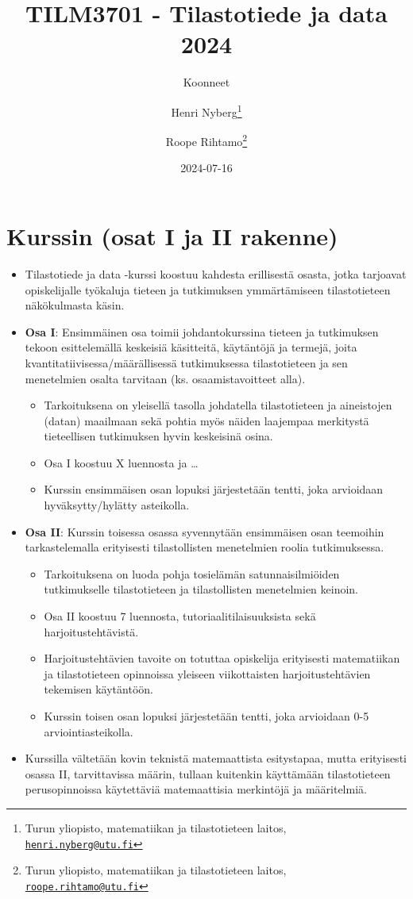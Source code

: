 \documentclass[
]{book}
\title{TILM3701 - Tilastotiede ja data 2024}
\author{Koonneet \and Henri Nyberg\footnote{Turun yliopisto, matematiikan ja tilastotieteen laitos, \href{mailto:henri.nyberg@utu.fi}{\nolinkurl{henri.nyberg@utu.fi}}} \and Roope Rihtamo\footnote{Turun yliopisto, matematiikan ja tilastotieteen laitos, \href{mailto:roope.rihtamo@utu.fi}{\nolinkurl{roope.rihtamo@utu.fi}}}}
\date{2024-07-16}
\providecommand{\tightlist}{%
  \setlength{\itemsep}{0pt}\setlength{\parskip}{0pt}}
\begin{document}
\maketitle

{
\hypersetup{linkcolor=}
\setcounter{tocdepth}{1}
\tableofcontents
}
\hypertarget{kurssin-osat-i-ja-ii-rakenne}{%
\chapter*{Kurssin (osat I ja II rakenne)}\label{kurssin-osat-i-ja-ii-rakenne}}

\begin{itemize}
\tightlist
\item
  Tilastotiede ja data -kurssi koostuu kahdesta erillisestä osasta, jotka tarjoavat opiskelijalle työkaluja tieteen ja tutkimuksen ymmärtämiseen tilastotieteen näkökulmasta käsin.
\item
  \textbf{Osa I}: Ensimmäinen osa toimii johdantokurssina tieteen ja tutkimuksen tekoon esittelemällä keskeisiä käsitteitä, käytäntöjä ja termejä, joita kvantitatiivisessa/määrällisessä tutkimuksessa tilastotieteen ja sen menetelmien osalta tarvitaan (ks. osaamistavoitteet alla).

  \begin{itemize}
  \tightlist
  \item
    Tarkoituksena on yleisellä tasolla johdatella tilastotieteen ja aineistojen (datan) maailmaan sekä pohtia myös näiden laajempaa merkitystä tieteellisen tutkimuksen hyvin keskeisinä osina.
  \item
    Osa I koostuu X luennosta ja \ldots{}
  \item
    Kurssin ensimmäisen osan lopuksi järjestetään tentti, joka arvioidaan hyväksytty/hylätty asteikolla.
  \end{itemize}
\item
  \textbf{Osa II}: Kurssin toisessa osassa syvennytään ensimmäisen osan teemoihin tarkastelemalla erityisesti tilastollisten menetelmien roolia tutkimuksessa.

  \begin{itemize}
  \tightlist
  \item
    Tarkoituksena on luoda pohja tosielämän satunnaisilmiöiden tutkimukselle tilastotieteen ja tilastollisten menetelmien keinoin.
  \item
    Osa II koostuu 7 luennosta, tutoriaalitilaisuuksista sekä harjoitustehtävistä.
  \item
    Harjoitustehtävien tavoite on totuttaa opiskelija erityisesti matematiikan ja tilastotieteen opinnoissa yleiseen viikottaisten harjoitustehtävien tekemisen käytäntöön.
  \item
    Kurssin toisen osan lopuksi järjestetään tentti, joka arvioidaan 0-5 arviointiasteikolla.
  \end{itemize}
\item
  Kurssilla vältetään kovin teknistä matemaattista esitystapaa, mutta erityisesti osassa II, tarvittavissa määrin, tullaan kuitenkin käyttämään tilastotieteen perusopinnoissa käytettäviä matemaattisia merkintöjä ja määritelmiä.


\end{itemize}
\end{document}
